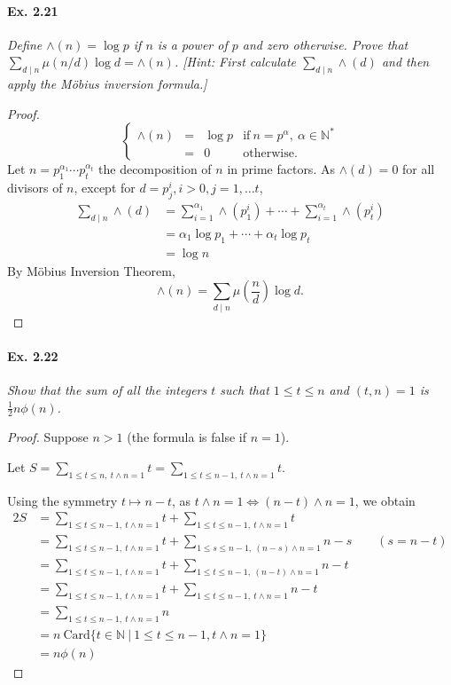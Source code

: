 \documentclass[11pt,a4paper]{article}
\newcommand{\N}{\mathbb{N}}
\begin{document}
{\paragraph{Ex. 2.21}

{\it Define $\land(n) = \log p$ if $n$ is a power of $p$ and zero otherwise. Prove that $\sum_{d \mid n} \mu(n/d)\log d = \land (n)$. [Hint: First calculate $\sum_{d \mid n} \land(d)$ and then apply the M\"{o}bius inversion formula.]
}

\begin{proof}
$$
\left\{
\begin{array}{cccl}
  \land(n)& =  & \log p & \mathrm{if}\  n =p^\alpha,\ \alpha \in \N^*  \\
  &  = &   0 & \mathrm{otherwise }.
\end{array}
\right.
$$
Let $n = p_1^{\alpha_1}\cdots p_t^{\alpha_t}$ the decomposition of $n$ in prime factors. As $\land(d) = 0$ for all divisors of $n$, except for $d = p_j^i, i>0, j=1,\ldots t$,
\begin{align*}
\sum_{d \mid n} \land(d)&= \sum_{i=1}^{\alpha_1} \land(p_1^{i}) + \cdots+ \sum_{i=1}^{\alpha_t} \land(p_t^{i})\\ 
&= \alpha_1 \log p_1+\cdots + \alpha_t \log p_t\\
&= \log n
\end{align*}
By M\"{o}bius Inversion Theorem,
$$\land(n) = \sum_{d \mid n} \mu\left (\frac{n}{d}\right ) \log d.$$
\end{proof}

\paragraph{Ex. 2.22}

{\it Show that the sum of all the integers $t$ such that $1 \leq t \leq n$ and $(t, n) = 1$ is $\frac{1}{2} n \phi(n)$.
}

\begin{proof}
Suppose $n >1$ (the formula is false if $n=1$).

Let $S = \sum\limits_{1\leq t \leq  n, \ t\wedge n =1} t = \sum\limits_{1\leq t \leq  n-1, \ t\wedge n =1} t$.

Using the symmetry  $t \mapsto n-t$, as $t\wedge n = 1 \iff (n-t) \wedge n = 1$, we obtain
\begin{align*}
2S &=  \sum_{1\leq t \leq  n-1, \ t\wedge n =1} t +  \sum_{1\leq t \leq  n-1, \ t\wedge n =1} t\\
&=  \sum_{1\leq t \leq   n-1, \ t\wedge n =1} t + \sum_{1\leq s \leq  n-1, \ (n-s) \wedge n =1}  n-s \qquad (s = n-t)\\
&=  \sum_{1\leq t \leq   n-1, \ t\wedge n =1} t + \sum_{1\leq t \leq  n-1, \ (n-t) \wedge n =1}  n-t \\
&=  \sum_{1\leq t \leq   n-1, \ t\wedge n =1} t + \sum_{1\leq t \leq  n-1,\  t \wedge n =1}  n-t \\
&= \sum_{1\leq t \leq  n-1,\  t \wedge n =1}  n\\
&= n \ \mathrm{Card} \{t \in \N \ \vert \  1\leq t \leq n-1, t\wedge n = 1\}\\
&= n \phi(n)
\end{align*} 


\end{proof}}
\end{document}
